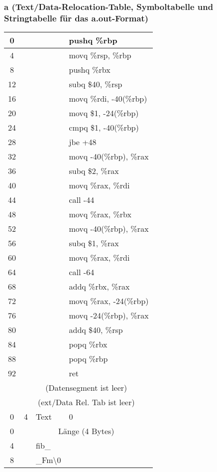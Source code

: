 \documentclass{ti2}
\begin{document}
\subsubsection{a (Text/Data-Relocation-Table, Symboltabelle und Stringtabelle für das a.out-Format)}


\begin{tabular}{|c|l l l|}
	\hline
	0 & & & pushq	\%rbp\\
	\hline
	4 & & & movq	\%rsp, \%rbp\\
	\hline
	8 & & & pushq	\%rbx\\
	\hline
	12 & & & subq	\$40, \%rsp\\
	\hline
	16 & & & movq	\%rdi, -40(\%rbp)\\
	\hline
	20 & & & movq	\$1, -24(\%rbp)\\
	\hline
	24 & & & cmpq	\$1, -40(\%rbp)\\
	\hline
	28 & & & jbe	+48\\
	\hline
	32 & & & movq	-40(\%rbp), \%rax\\
	\hline
	36 & & & subq	\$2, \%rax\\
	\hline
	40 & & & movq	\%rax, \%rdi\\
	\hline
	44 & & & call	-44\\
	\hline
	48 & & & movq	\%rax, \%rbx\\
	\hline
	52 & & & movq	-40(\%rbp), \%rax\\
	\hline
	56 & & & subq	\$1, \%rax\\
	\hline
	60 & & & movq	\%rax, \%rdi\\
	\hline
	64 & & & call	-64\\
	\hline
	68 & & & addq	\%rbx, \%rax\\
	\hline
	72 & & & movq	\%rax, -24(\%rbp) \\
	\hline
	76 & & & movq	-24(\%rbp), \%rax\\
	\hline
	80 & & & addq	\$40, \%rsp\\
	\hline
	84 & & & popq	\%rbx\\
	\hline
	88 & & & popq	\%rbp\\
	\hline
	92 & & & ret\\
	\hline
	& \multicolumn{3}{|c|}{(Datensegment ist leer)} \\
	\hline
	& \multicolumn{3}{|c|}{(ext/Data Rel. Tab ist leer)} \\
	\hline
	0 & 4 & Text & 0 \\
	\hline
	0 & \multicolumn{3}{|c|}{Länge (4 Bytes)} \\
	\hline
	4 &  & fib\_ &  \\
	\hline
	8 & & \_Fm\textbackslash0 & \\
	\hline
\end{tabular}
\end{document}
